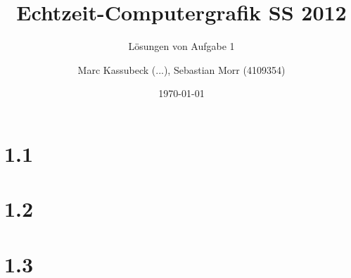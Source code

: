 \documentclass[a4paper]{scrartcl}
\title{Echtzeit-Computergrafik SS 2012}
\subtitle{Lösungen von Aufgabe 1}
\author{Marc Kassubeck (...), Sebastian Morr (4109354)}
\date{\today}
\begin{document}
 

\maketitle

\section*{1.1}

\section*{1.2}

\section*{1.3}
\end{document}
